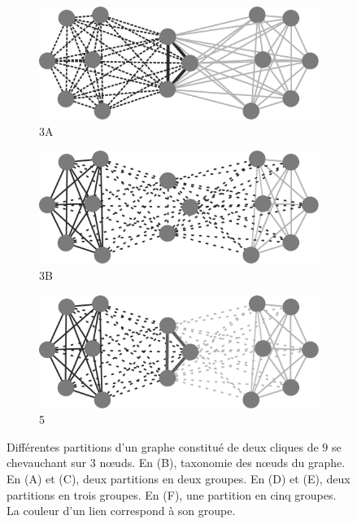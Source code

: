 \begin{figure}[h]
	\begin{subfigure}{0.3\linewidth}
			\includegraphics[width=\linewidth]{img/ExpectedNodes/2Cliques/PartitionExamples/Clique3A}
			\caption{3A\label{fig:2C3A}}		
	\end{subfigure}
	\begin{subfigure}{0.3\linewidth}
		\includegraphics[width=\linewidth]{img/ExpectedNodes/2Cliques/PartitionExamples/Clique3B}
		\caption{3B\label{fig:2C3B}}	
	\end{subfigure}
	\begin{subfigure}{0.3\linewidth}
			\includegraphics[width=\linewidth]{img/ExpectedNodes/2Cliques/PartitionExamples/Clique5}
			\caption{5\label{fig:2C5}}		
	\end{subfigure}
	\caption{Différentes partitions d'un graphe constitué de deux cliques de $9$ se chevauchant sur $3$ n\oe{}uds.
	En (B), taxonomie des n\oe{}uds du graphe.
	En (A) et (C), deux partitions en deux groupes.
	En (D) et (E), deux partitions en trois groupes.
	En (F), une partition en cinq groupes.
	La couleur d'un lien correspond à son groupe.}
	\label{fig:2C}
\end{figure}

